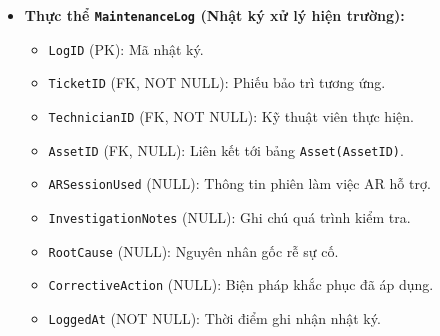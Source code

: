 \begin{itemize}[leftmargin=2em]
\begin{itemize}
        \item \texttt{CompletedAt} (NULL): Thời điểm hoàn tất công việc.
    \end{itemize}
    \item \textbf{Thực thể \texttt{MaintenanceLog} (Nhật ký xử lý hiện trường):}
    \begin{itemize}
        \item \texttt{LogID} (PK): Mã nhật ký.
        \item \texttt{TicketID} (FK, NOT NULL): Phiếu bảo trì tương ứng.
        \item \texttt{TechnicianID} (FK, NOT NULL): Kỹ thuật viên thực hiện.
        \item \texttt{AssetID} (FK, NULL): Liên kết tới bảng \texttt{Asset(AssetID)}.
        \item \texttt{ARSessionUsed} (NULL): Thông tin phiên làm việc AR hỗ trợ.
        \item \texttt{InvestigationNotes} (NULL): Ghi chú quá trình kiểm tra.
        \item \texttt{RootCause} (NULL): Nguyên nhân gốc rễ sự cố.
        \item \texttt{CorrectiveAction} (NULL): Biện pháp khắc phục đã áp dụng.
        \item \texttt{LoggedAt} (NOT NULL): Thời điểm ghi nhận nhật ký.
    \end{itemize}
\end{itemize}

